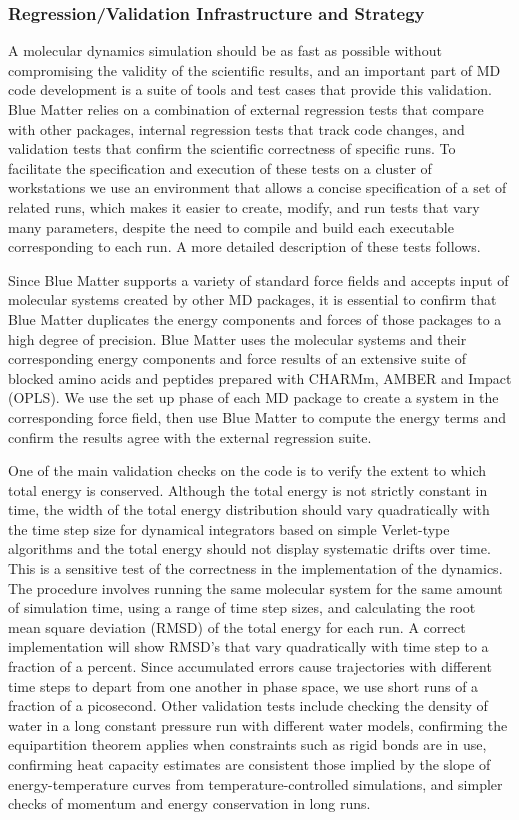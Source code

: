\documentclass[doublespacing]{elsart}
\begin{document}
\subsubsection{Regression/Validation Infrastructure and Strategy}

A molecular dynamics simulation should be as fast as possible without
compromising the validity of the scientific results, and an important
part of MD code development is a suite of tools and test cases that provide
this validation\cite{gunsteren:1998}.  Blue Matter relies on a combination
of external regression tests that compare with other packages, internal
regression tests that track code changes, and validation tests that confirm
the scientific correctness of specific runs.  To facilitate the specification
and execution of these tests on a cluster of workstations we use
an environment that allows a concise specification of a
set of related runs, which makes it easier to create, modify, and run tests
that vary many parameters, despite the need to compile and build each
executable corresponding to each run. A more detailed description of these
tests follows.

Since Blue Matter supports a variety of standard force fields and
accepts input of molecular systems created by other MD packages, it is
essential to confirm that Blue Matter duplicates the energy components
and forces of those packages to a high degree of precision.  Blue
Matter uses the molecular systems and their corresponding energy
components and force results of an extensive suite of blocked amino
acids and peptides prepared with CHARMm, AMBER and Impact
(OPLS).\cite{brookssuite:2001} We use the set up phase of each MD
package to create a system in the corresponding force field, then use
Blue Matter to compute the energy terms and confirm the results agree
with the external regression suite.

One of the main validation checks on the code is to verify the extent
to which total energy is conserved. Although the total energy is not
strictly constant in time, the width of the total energy distribution
should vary quadratically with the time step size for dynamical
integrators based on simple Verlet-type algorithms and the total
energy should not display systematic drifts over time.  This is a
sensitive test of the correctness in the implementation of the
dynamics.  The procedure involves running the same molecular system
for the same amount of simulation time, using a range of time step
sizes, and calculating the root mean square deviation (RMSD) of the
total energy for each run.  A correct implementation will show RMSD's
that vary quadratically with time step to a fraction of a percent.
Since accumulated errors cause trajectories with different time steps
to depart from one another in phase space, we use short runs of a
fraction of a picosecond.  Other validation tests include checking the
density of water in a long constant pressure run with different water
models, confirming the equipartition theorem applies when constraints
such as rigid bonds are in use, confirming heat capacity estimates are
consistent those implied by the slope of energy-temperature curves
from temperature-controlled simulations, and simpler checks of
momentum and energy conservation in long runs.
\end{document}
